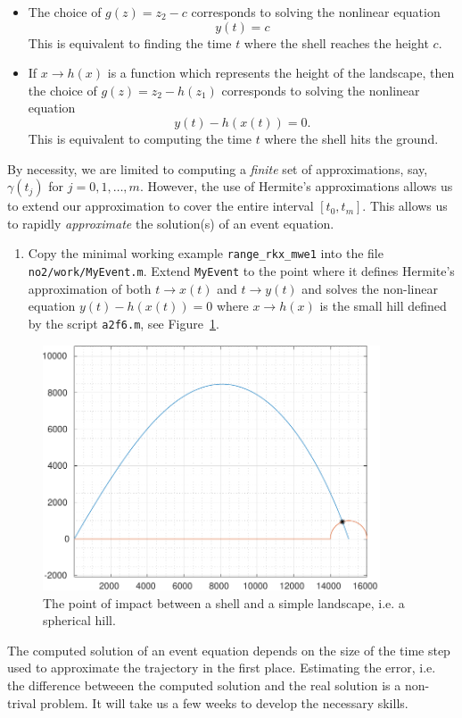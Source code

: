 \documentclass[a4paper,12pt]{article}
\newcounter{problem}
\newcounter{remark}
\newenvironment{remark}{\refstepcounter{remark} \vspace{0.1cm} \par \noindent {\bf Remark \arabic{remark}}}{\vspace{0.3cm}}
\newcommand{\bes}{\begin{equation*}}
\newcommand{\ees}{\end{equation*}}
\newcommand{\be}{\begin{equation}}
\newcommand{\ee}{\end{equation}}
\begin{document}
   \begin{itemize}
   \item The choice of $g(z) = z_2 - c$ corresponds to solving the nonlinear equation
     \be
     y(t) = c
     \ee
     This is equivalent to finding the time $t$ where the shell reaches the height $c$. 
   \item If $x \rightarrow h(x)$ is a function which represents the height of the landscape, then the choice of $g(z) = z_2 - h(z_1)$ corresponds to solving the nonlinear equation
     \bes
     y(t) - h(x(t)) = 0.
     \ees
     This is equivalent to computing the time $t$ where the shell hits the ground.
   \end{itemize}
   By necessity, we are limited to computing a \textit{finite} set of approximations, say, $\gamma(t_j)$ for $j=0,1,\dots,m$. However, the use of Hermite's approximations allows us to extend our approximation to cover the entire interval $[t_0,t_m]$. This allows us to rapidly \textit{approximate} the solution(s) of an event equation.

   \begin{enumerate}
   \item Copy the minimal working example {\tt range\_rkx\_mwe1} into the file {\tt no2/work/MyEvent.m}. Extend {\tt MyEvent} to the point where it defines Hermite's approximation of both $t \rightarrow x(t)$ and $t \rightarrow y(t)$ and solves the non-linear equation $y(t) - h(x(t)) = 0$ where $x \rightarrow h(x) $ is the small hill defined by the script {\tt a2f6.m}, see Figure~\ref{fig:MyEvent}.
   \end{enumerate}

\begin{figure}
    \centering
    \includegraphics[width=10cm]{MyEvent.pdf} \caption[The point of impact between a shell and a simple landscape]{The point of impact between a shell and a simple landscape, i.e. a spherical hill.} \label{fig:MyEvent}
    \end{figure}

    \begin{remark} The computed solution of an event equation depends on the size of the time step used to approximate the trajectory in the first place. Estimating the error, i.e. the difference betweeen the computed solution and the real solution is a non-trival problem. It will take us a few weeks to develop the necessary skills.
   \end{remark}

   
   



  
\end{document}
